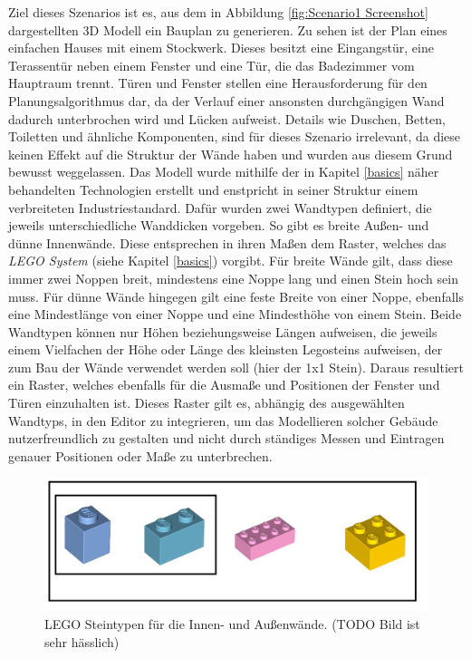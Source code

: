 Ziel dieses Szenarios ist es, aus dem in Abbildung \ref{fig:Scenario1 Screenshot} dargestellten 3D Modell ein Bauplan zu generieren.
Zu sehen ist der Plan eines einfachen Hauses mit einem Stockwerk.
Dieses besitzt eine Eingangstür, eine Terassentür neben einem Fenster und eine Tür, die das Badezimmer vom Hauptraum trennt.
Türen und Fenster stellen eine Herausforderung für den Planungsalgorithmus dar, da der Verlauf einer ansonsten durchgängigen Wand dadurch unterbrochen wird und Lücken aufweist.
Details wie Duschen, Betten, Toiletten und ähnliche Komponenten, sind für dieses Szenario irrelevant, da diese keinen Effekt auf die Struktur der Wände haben und wurden aus diesem Grund bewusst weggelassen.
Das Modell wurde mithilfe der in Kapitel \ref{basics} näher behandelten Technologien erstellt und enstpricht in seiner Struktur einem verbreiteten Industriestandard.
Dafür wurden zwei Wandtypen definiert, die jeweils unterschiedliche Wanddicken vorgeben.
So gibt es breite Außen- und dünne Innenwände.
Diese entsprechen in ihren Maßen dem Raster, welches das \textit{LEGO System} (siehe Kapitel \ref{basics}) vorgibt.
Für breite Wände gilt, dass diese immer zwei Noppen breit, mindestens eine Noppe lang und einen Stein hoch sein muss.
Für dünne Wände hingegen gilt eine feste Breite von einer Noppe, ebenfalls eine Mindestlänge von einer Noppe und eine Mindesthöhe von einem Stein.
Beide Wandtypen können nur Höhen beziehungsweise Längen aufweisen, die jeweils einem Vielfachen der Höhe oder Länge des kleinsten Legosteins aufweisen, der zum Bau der Wände verwendet werden soll (hier der 1x1 Stein).
Daraus resultiert ein Raster, welches ebenfalls für die Ausmaße und Positionen der Fenster und Türen einzuhalten ist.
Dieses Raster gilt es, abhängig des ausgewählten Wandtyps, in den Editor zu integrieren, um das Modellieren solcher Gebäude nutzerfreundlich zu gestalten und nicht durch ständiges Messen und Eintragen genauer Positionen oder Maße zu unterbrechen.

\begin{figure}[!ht]
    \centering
    \includegraphics[width=0.6\columnwidth]{fig/scenario1_lego_set.png}
    \caption{LEGO Steintypen für die Innen- und Außenwände. (TODO Bild ist sehr hässlich)}
    \label{fig:Scenario1 Lego Set}
\end{figure}


